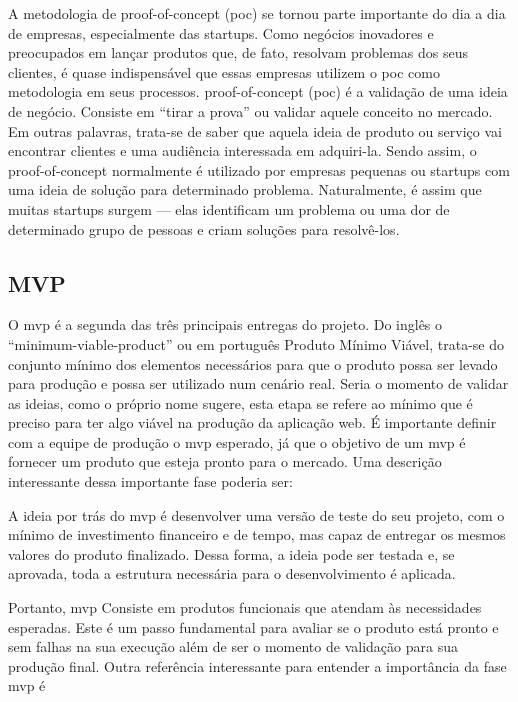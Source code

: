     \begin{citacao}
        A metodologia de \gls{proof-of-concept} (\ac{poc}) se tornou parte importante do dia a dia de empresas, especialmente das \gls{startups}. Como negócios inovadores e preocupados em lançar produtos que, de fato, resolvam problemas dos seus clientes, é quase indispensável que essas empresas utilizem o \ac{poc} como metodologia em seus processos. \gls{proof-of-concept} (\ac{poc}) é a validação de uma ideia de negócio. Consiste em “tirar a prova” ou validar aquele conceito no mercado. Em outras palavras, trata-se de saber que aquela ideia de produto ou serviço vai encontrar clientes e uma audiência interessada em adquiri-la. Sendo assim, o \ac{proof-of-concept} normalmente é utilizado por empresas pequenas ou \gls{startups} com uma ideia de solução para determinado problema. Naturalmente, é assim que muitas \gls{startups} surgem — elas identificam um problema ou uma dor de determinado grupo de pessoas e criam soluções para resolvê-los.
        \cite{ranDon2022}
    \end{citacao}
    
    \subsection{MVP}
    O \ac{mvp} é a segunda das três principais entregas do projeto.
    Do inglês o “\ac{minimum-viable-product}” ou em português Produto Mínimo Viável, trata-se do conjunto mínimo dos elementos necessários para que o produto possa ser levado para produção e possa ser utilizado num cenário real. Seria o momento de validar as ideias, como o próprio nome sugere, esta etapa se refere ao mínimo que é preciso para ter algo viável na produção da aplicação web. 
    É importante definir com a equipe de produção o \ac{mvp} esperado, já que  o objetivo de um \ac{mvp} é fornecer um produto que esteja pronto para o mercado. Uma descrição interessante dessa importante fase poderia ser:
    
    \begin{citacao}
        A ideia por trás do \ac{mvp} é desenvolver uma versão de teste do seu projeto, com o mínimo de investimento financeiro e de tempo, mas capaz de entregar os mesmos valores do produto finalizado. Dessa forma, a ideia pode ser testada e, se aprovada, toda a estrutura necessária para o desenvolvimento é aplicada.
        \cite{rockContent2022}
    \end{citacao}
    
    Portanto, \ac{mvp} Consiste em produtos funcionais que atendam às necessidades esperadas. Este é um passo fundamental para avaliar se o produto está pronto e sem falhas na sua execução além de ser o momento de validação para sua produção final. Outra referência interessante para entender a importância da fase \ac{mvp} é
    
